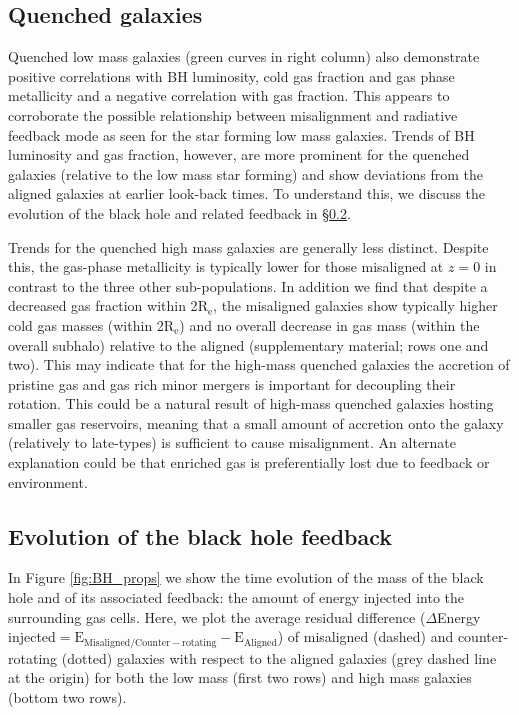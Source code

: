 \subsection{Quenched galaxies}
Quenched low mass galaxies (green curves in right column) also demonstrate positive correlations with BH luminosity, cold gas fraction and gas phase metallicity and a negative correlation with gas fraction. This appears to corroborate the possible relationship between misalignment and radiative feedback mode as seen for the star forming low mass galaxies. Trends of BH luminosity and gas fraction, however, are more prominent for the quenched galaxies (relative to the low mass star forming) and show deviations from the aligned galaxies at earlier look-back times. To understand this, we discuss the evolution of the black hole and related feedback in \S\ref{sec:evolution}.
 
Trends for the quenched high mass galaxies are generally less distinct. Despite this, the gas-phase metallicity is typically lower for those misaligned at $z=0$ in contrast to the three other sub-populations. In addition we find that despite a decreased gas fraction within 2$\mathrm{R_{e}}$, the misaligned galaxies show typically higher cold gas masses (within 2$\mathrm{R_{e}}$) and no overall decrease in gas mass (within the overall subhalo) relative to the aligned (supplementary material; rows one and two). This may indicate that for the high-mass quenched galaxies the accretion of pristine gas and gas rich minor mergers is important for decoupling their rotation. This could be a natural result of high-mass quenched galaxies hosting smaller gas reservoirs, meaning that a small amount of accretion onto the galaxy (relatively to late-types) is sufficient to cause misalignment. An alternate explanation could be that enriched gas is preferentially lost due to feedback or environment. %
 
\subsection{Evolution of the black hole feedback} \label{sec:evolution}
In Figure \ref{fig:BH_props} we show the time evolution of the mass of the black hole and of its associated feedback: the amount of energy injected into the surrounding gas cells. Here, we plot the average residual difference ($\Delta$Energy injected$\mathrm{ = E_{Misaligned/Counter-rotating} - E_{Aligned}}$) of misaligned (dashed) and counter-rotating (dotted) galaxies with respect to the aligned galaxies (grey dashed line at the origin) for both the low mass (first two rows) and high mass galaxies (bottom two rows).

